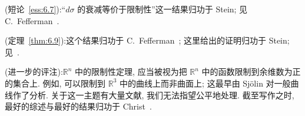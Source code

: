 \noindent (短论~\ref{ess:6.7}):\quad ``$d\sigma$ 的衰减等价于限制性''这一结果归功于 Stein; 见 C.~Fefferman~\cite{fefferman-stronglysingular}.

\noindent (定理~\ref{thm:6.9}):\quad 这个结果归功于 C.~Fefferman~\cite{fefferman-stronglysingular}; 这里给出的证明归功于 Stein; 见~\cite{fefferman-spherical}.

\noindent (进一步的评注):\quad $\mathbb{R}^n$ 中的限制性定理, 应当被视为把 $\mathbb{R}^n$ 中的函数限制到余维数为正的集合上. 例如, 可以限制到 $\mathbb{R}^3$ 中的曲线上而非曲面上; 这最早由 Sj\"olin 对一般曲线作了分析. 关于这一主题有大量文献, 我们无法指望公平地处理. 截至写作之时, 最好的综述与最好的结果归功于 Christ~\cite{christ}.

